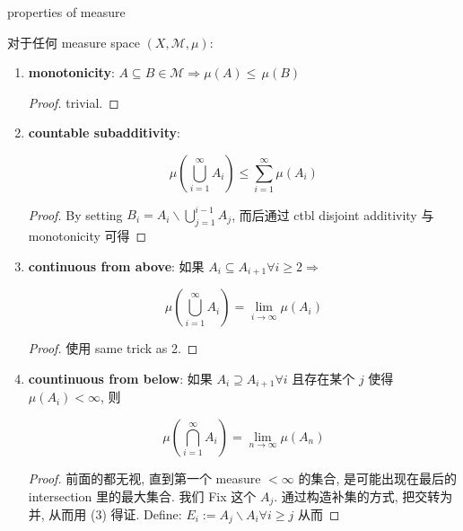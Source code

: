 \documentclass{qlnotes-export}
\begin{document}
\begin{theorem}{properties of measure}\label{thm-01-sigma-algebra-measure-properties-of-measure}

对于任何 measure space \((X,\mathcal{M},\mu)\):

\begin{enumerate}
\item
  \textbf{monotonicity}: \(A \subseteq B \in \mathcal{M}\Longrightarrow\mu(A) \leq \,\mu(B)\)

  \begin{proof}

  trivial.

  \end{proof}
\item
  \textbf{countable subadditivity}:

  \[\mu(\bigcup\limits_{i = 1}^{\infty}A_{i}) \leq \sum\limits_{i = 1}^{\infty}\mu(A_{i})\]

  \begin{proof}

  By setting \(B_{i} = A_{i}\backslash\bigcup_{j = 1}^{i - 1}A_{j}\), 而后通过 ctbl disjoint additivity 与 monotonicity 可得

  \end{proof}
\item
  \textbf{continuous from above}: 如果 \(A_{i} \subseteq A_{i + 1}\forall i \geq 2\Longrightarrow\)

  \[\mu(\bigcup\limits_{i = 1}^{\infty}A_{i}) = \lim\limits_{i\rightarrow\infty}\mu(A_{i})\]

  \begin{proof}

  使用 same trick as 2.

  \end{proof}
\item
  \textbf{countinuous from below}: 如果 \(A_{i} \supseteq A_{i + 1}\forall i\) 且存在某个 \(j\) 使得 \(\mu(A_{i}) < \infty\), 则

  \[\mu(\bigcap\limits_{i = 1}^{\infty}A_{i}) = \lim\limits_{n\rightarrow\infty}\mu(A_{n})\]

  \begin{proof}

  前面的都无视, 直到第一个 measure \(< \infty\) 的集合, 是可能出现在最后的 intersection 里的最大集合. 我们 Fix 这个 \(A_{j}\). 通过构造补集的方式, 把交转为并, 从而用 (3) 得证. Define: \(E_{i} := A_{j}\backslash A_{i}\forall i \geq j\) 从而


\end{proof}
\end{enumerate}
\end{theorem}
\end{document}
